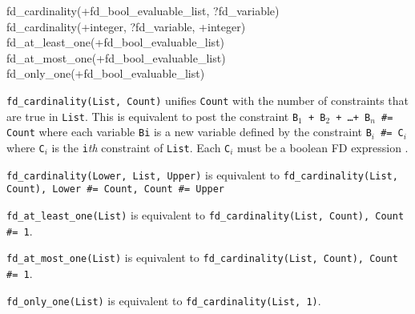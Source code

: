 \begin{TemplatesOneCol}
fd\_cardinality(+fd\_bool\_evaluable\_list, ?fd\_variable)\\
fd\_cardinality(+integer, ?fd\_variable, +integer)\\
fd\_at\_least\_one(+fd\_bool\_evaluable\_list)\\
fd\_at\_most\_one(+fd\_bool\_evaluable\_list)\\
fd\_only\_one(+fd\_bool\_evaluable\_list)

\end{TemplatesOneCol}

\Description

\texttt{fd\_cardinality(List, Count)} unifies \texttt{Count} with the number
of constraints that are true in \texttt{List}. This is equivalent to post
the constraint \texttt{B$_{1}$ + B$_{2}$ + \ldots + B$_{n}$ \#= Count}
where each variable \texttt{Bi} is a new variable defined by the constraint
\texttt{B$_{i}$ \#{\lt}={\gt} C$_{i}$} where \texttt{C$_{i}$} is the
\texttt{i}\emph{th} constraint of \texttt{List}. Each \texttt{C$_{i}$}
must be a boolean FD expression .

\texttt{fd\_cardinality(Lower, List, Upper)} is equivalent to
\texttt{fd\_cardinality(List, Count), Lower \#={\lt} Count, Count \#={\lt}
Upper}

\texttt{fd\_at\_least\_one(List)} is equivalent to
\texttt{fd\_cardinality(List, Count), Count \#{\gt}= 1}.

\texttt{fd\_at\_most\_one(List)} is equivalent to
\texttt{fd\_cardinality(List, Count), Count \#={\lt} 1}.

\texttt{fd\_only\_one(List)} is equivalent to \texttt{fd\_cardinality(List,
1)}.

\begin{PlErrors}









\end{PlErrors}

